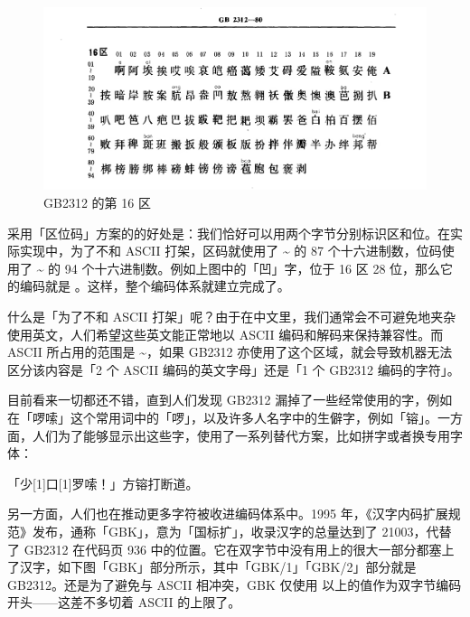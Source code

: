 \begin{figure}[htb!]
  \centering
  \includegraphics[width=.8\textwidth]{assets/advanced/GB2312.png}
  \caption{GB2312 的第 16 区}
  \label{fig:GB2312-block-16}
\end{figure}

采用「区位码」方案的的好处是：我们恰好可以用两个字节分别标识区和位。在实际实现中，为了不和 ASCII 打架，区码就使用了 \textasciitilde{} 的 87 个十六进制数，位码使用了 \textasciitilde{} 的 94 个十六进制数。例如上图中的「凹」字，位于 16 区 28 位，那么它的编码就是 。这样，整个编码体系就建立完成了。

\begin{note}
  什么是「为了不和 ASCII 打架」呢？由于在中文里，我们通常会不可避免地夹杂使用英文，人们希望这些英文能正常地以 ASCII 编码和解码来保持兼容性。而 ASCII 所占用的范围是 \textasciitilde{}，如果 GB2312 亦使用了这个区域，就会导致机器无法区分该内容是「2 个 ASCII 编码的英文字母」还是「1 个 GB2312 编码的字符」。
\end{note}

目前看来一切都还不错，直到人们发现 GB2312 漏掉了一些经常使用的字，例如在「啰嗦」这个常用词中的「啰」，以及许多人名字中的生僻字，例如「镕」。一方面，人们为了能够显示出这些字，使用了一系列替代方案，比如拼字或者换专用字体：

\begin{quoting}
  「少\scalebox{0.4}[1]{口}\scalebox{0.6}[1]{罗}嗦！」方{\SimSun 镕}打断道。
\end{quoting}

另一方面，人们也在推动更多字符被收进编码体系中。1995 年，《汉字内码扩展规范》发布，通称「GBK」，意为「国标扩」，收录汉字的总量达到了 21003，代替了 GB2312 在代码页 936 中的位置。它在双字节中没有用上的很大一部分都塞上了汉字，如下图「GBK」部分所示，其中「GBK/1」「GBK/2」部分就是 GB2312。还是为了避免与 ASCII 相冲突，GBK 仅使用  以上的值作为双字节编码开头——这差不多切着 ASCII  的上限了。

